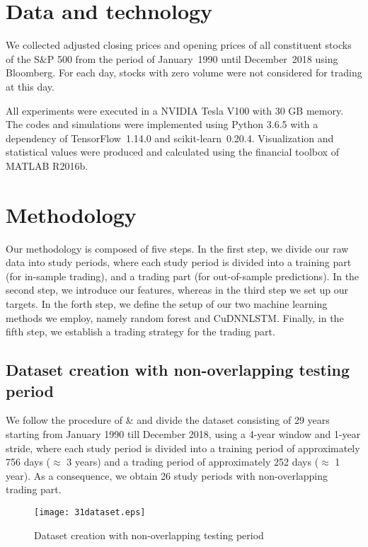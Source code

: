 \documentclass[review]{elsarticle}
\begin{document}
\section{Data and technology}\label{sec:data}

 We collected adjusted closing prices and opening prices
of all constituent stocks of the S$\&$P 500 from the period of January~1990 until December~2018 using Bloomberg. For each day, stocks with zero volume were  not considered for trading at this day.


All experiments were executed in a NVIDIA Tesla V100 with 30 GB memory. The codes and simulations were implemented using Python 3.6.5 with a dependency of 
TensorFlow~1.14.0 and scikit-learn~0.20.4.
Visualization and statistical values were produced and calculated using the financial toolbox of MATLAB R2016b. 


\section{Methodology}\label{sec:method}
Our methodology is composed of five steps. In the first step, we divide our raw data into study periods, where each study period is divided into a training part (for in-sample trading), and a trading part (for out-of-sample predictions). 
In the second step, we introduce our features, whereas 
in the third step we set up our targets. 
In the forth step, we  define the setup of our two machine learning methods we employ, namely random forest and CuDNNLSTM. 
Finally, in the fifth step, we establish a trading strategy for the trading part. 





\subsection{Dataset creation with non-overlapping testing period}

We follow the procedure of \cite{krauss17} \& \cite{krauss18} and divide the  dataset consisting of 29 years starting from January 1990 till December 2018, using a 4-year window and 1-year stride, where each study period is divided into a training period of approximately 756 days ($\approx$ 3 years) and a trading period of  approximately 252 days ($\approx$ 1 year). As a consequence, we obtain 26 study periods with non-overlapping trading part. 


\begin{figure}[h!]
	\centering
	
	\texttt{[image: 31dataset.eps]} \hfill
	\caption{Dataset creation with non-overlapping testing period}
	\label{fig:figure3.1.dataset}
\end{figure}
\end{document}
